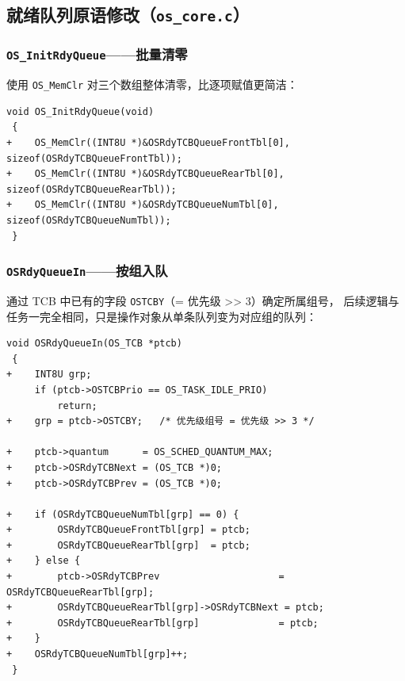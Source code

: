 \documentclass[12pt,a4paper]{article}
\begin{document}
\subsection{就绪队列原语修改（\texttt{os\_core.c}）}

\subsubsection{\texttt{OS\_InitRdyQueue}——批量清零}

使用 \texttt{OS\_MemClr} 对三个数组整体清零，比逐项赋值更简洁：

\begin{lstlisting}[style=diffstyle,caption={os\_core.c — 分组队列初始化}]
 void OS_InitRdyQueue(void)
 {
+    OS_MemClr((INT8U *)&OSRdyTCBQueueFrontTbl[0], sizeof(OSRdyTCBQueueFrontTbl));
+    OS_MemClr((INT8U *)&OSRdyTCBQueueRearTbl[0],  sizeof(OSRdyTCBQueueRearTbl));
+    OS_MemClr((INT8U *)&OSRdyTCBQueueNumTbl[0],   sizeof(OSRdyTCBQueueNumTbl));
 }
\end{lstlisting}

\subsubsection{\texttt{OSRdyQueueIn}——按组入队}

通过 TCB 中已有的字段 \texttt{OSTCBY}（= 优先级 >> 3）确定所属组号，
后续逻辑与任务一完全相同，只是操作对象从单条队列变为对应组的队列：

\begin{lstlisting}[style=diffstyle,caption={os\_core.c — 按组入队}]
 void OSRdyQueueIn(OS_TCB *ptcb)
 {
+    INT8U grp;
     if (ptcb->OSTCBPrio == OS_TASK_IDLE_PRIO)
         return;
+    grp = ptcb->OSTCBY;   /* 优先级组号 = 优先级 >> 3 */

+    ptcb->quantum      = OS_SCHED_QUANTUM_MAX;
+    ptcb->OSRdyTCBNext = (OS_TCB *)0;
+    ptcb->OSRdyTCBPrev = (OS_TCB *)0;

+    if (OSRdyTCBQueueNumTbl[grp] == 0) {
+        OSRdyTCBQueueFrontTbl[grp] = ptcb;
+        OSRdyTCBQueueRearTbl[grp]  = ptcb;
+    } else {
+        ptcb->OSRdyTCBPrev                     = OSRdyTCBQueueRearTbl[grp];
+        OSRdyTCBQueueRearTbl[grp]->OSRdyTCBNext = ptcb;
+        OSRdyTCBQueueRearTbl[grp]              = ptcb;
+    }
+    OSRdyTCBQueueNumTbl[grp]++;
 }
\end{lstlisting}
\end{document}
